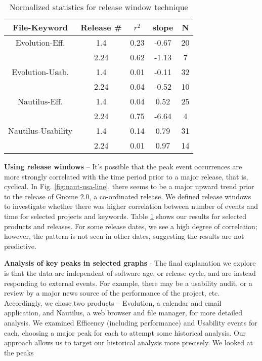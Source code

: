 \documentclass[conference, compsoc]{IEEEtran}
\begin{document}
\begin{table}
	\caption{Normalized statistics for release window technique}
	\centering
	\label{tbl:windows}
\begin{tabular}{|c|c|c|c|c|}
\hline
\rowcolor[gray]{.9} 
File-Keyword & Release \# & $r^2$ & slope & N\\ \hline
Evolution-Eff. & 1.4 & 0.23 & -0.67 & 20 \\
 & 2.24 & 0.62 & -1.13 & 7\\ \hline
Evolution-Usab. & 1.4 & 0.01 & -0.11 & 32\\
 & 2.24 & 0.04 & -0.52 & 10 \\ \hline
Nautilus-Eff. & 1.4 & 0.04 & 0.52 & 25 \\
 & 2.24 & 0.75 & -6.64 & 4 \\ \hline
Nautilus-Usability & 1.4 & 0.14 & 0.79 & 31\\
 & 2.24 & 0.01 & 0.97 & 14\\

\hline
\end{tabular}
\end{table}

\noindent\textbf{Using release windows} -- It's possible that the peak event occurrences are more strongly correlated with the time period prior to a major release, that is, cyclical. In Fig. \ref{fig:naut-usa-line}, there seems to be a major upward trend prior to the release of Gnome 2.0, a co-ordinated release. We defined release windows to investigate whether there was higher correlation between number of events and time for selected projects and keywords. Table \ref{tbl:windows} shows our results for selected products and releases. For some release dates, we see a high degree of correlation; however, the pattern is not seen in other dates, suggesting the results are not predictive. 

\noindent\textbf{Analysis of key peaks in selected graphs} - The final explanation we explore is that the data are independent of software age, or release cycle, and are instead responding to external events. For example, there may be a usability audit, or a review by a major news source of the performance of the project, etc. Accordingly, we chose two products -- Evolution, a calendar and email application, and Nautilus, a web browser and file manager, for more detailed analysis. We examined Efficency (including performance) and Usability events for each, choosing a major peak for each to attempt some historical analysis. Our approach allows us to target our historical analysis more precisely. We looked at the peaks
\end{document}
